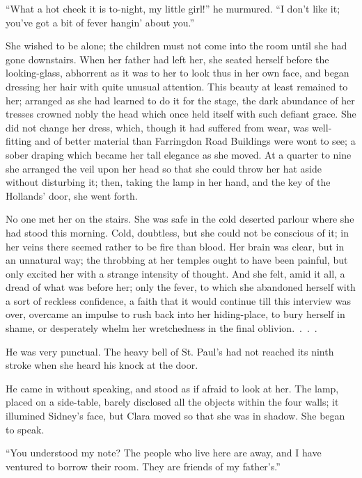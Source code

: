 ``What a hot cheek it is to-night, my little girl!'' he murmured. ``I
don't like it; you've got a bit of fever hangin' about you.''

She wished to be alone; the children must not come into the room until
she had gone downstairs. When her father had left her, she seated
herself before the looking-glass, abhorrent as it was to her to look
thus in her own face, and began dressing her hair with {}quite unusual
attention. This beauty at least remained to her; arranged as she had
learned to do it for the stage, the dark abundance of her tresses
crowned nobly the head which once held itself with such defiant grace.
She did not change her dress, which, though it had suffered from wear,
was well-fitting and of better material than Farringdon Road Buildings
were wont to see; a sober draping which became her tall elegance as she
moved. At a quarter to nine she arranged the veil upon her head so that
she could throw her hat aside without disturbing it; then, taking the
lamp in her hand, and the key of the Hollands' door, she went forth.

No one met her on the stairs. She was safe in the cold deserted parlour
where she had stood this morning. Cold, doubtless, but she could not be
conscious of it; in her veins there seemed rather to be fire than blood.
Her brain was clear, but in an unnatural way; the throbbing at her
temples ought to have been painful, but only excited her with a strange
intensity of thought. And she felt, amid it all, a dread of what was
before her; only the fever, to which she abandoned herself with a {}sort
of reckless confidence, a faith that it would continue till this
interview was over, overcame an impulse to rush back into her
hiding-place, to bury herself in shame, or desperately whelm her
wretchedness in the final {oblivion{.~.~.~.}}

He was very punctual. The heavy bell of St. Paul's had not reached its
ninth stroke when she heard his knock at the door.

He came in without speaking, and stood as if afraid to look at her. The
lamp, placed on a side-table, barely disclosed all the objects within
the four walls; it illumined Sidney's face, but Clara moved so that she
was in shadow. She began to speak.

``You understood my note? The people who live here are away, and I have
ventured to borrow their room. They are friends of my father's.''

